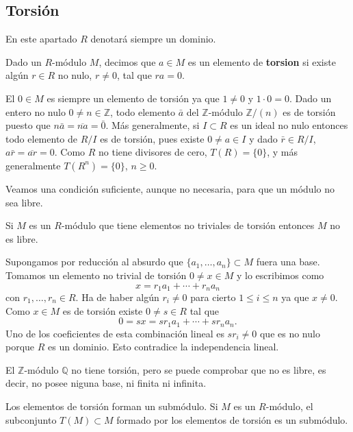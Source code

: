 \hypertarget{torsiuxf3n}{%
\subsection{Torsión}\label{torsiuxf3n}}

En este apartado \(R\) denotará siempre un dominio.


Dado un \(R\)-módulo \(M\), decimos que \(a\in M\) es un elemento de
\textbf{torsion} si existe algún \(r\in R\) no nulo, \(r\neq 0\), tal
que \(ra=0\). 


El \(0\in M\) es siempre un elemento de torsión ya que \(1\neq 0\) y
\(1\cdot 0 = 0\). Dado un entero no nulo \(0\neq n\in\mathbb Z\), todo
elemento \(\bar a\) del \(\mathbb Z\)-módulo \(\mathbb Z/(n)\) es de
torsión puesto que \(n\bar a=\overline{na}=\bar 0\). Más generalmente,
si \(I\subset R\) es un ideal no nulo entonces todo elemento de \(R/I\)
es de torsión, pues existe \(0\neq a\in I\) y dado \(\bar r\in R/I\),
\(a\bar r=\overline{ar}=0\). Como \(R\) no tiene divisores de cero,
\(T( {R} )=\{0\}\), y más generalmente \(T(R^n)=\{0\}\),
\(n\geq 0\). 

Veamos una condición suficiente, aunque no necesaria, para que un módulo
no sea libre.


Si \(M\) es un \(R\)-módulo que tiene elementos no triviales de torsión
entonces \(M\) no es libre. 


Supongamos por reducción al absurdo que
\(\{a_1,\dots,a_n\}\subset M\) fuera una base. Tomamos un elemento
no trivial de torsión \(0\neq x\in M\) y lo escribimos como
\[x=r_1a_1+\cdots+r_na_n\] con \(r_1,\dots,r_n\in R\). Ha de haber
algún \(r_i\neq 0\) para cierto \(1\leq i\leq n\) ya que \(x\neq 0\).
Como \(x\in M\) es de torsión existe \(0\neq s\in R\) tal que
\[0=sx=sr_1a_1+\cdots+sr_na_n.\] Uno de los coeficientes de esta
combinación lineal es \(sr_i\neq 0\) que es no nulo porque \(R\) es un
dominio. Esto contradice la independencia lineal. 


El \(\mathbb Z\)-módulo \(\mathbb Q\) no tiene torsión, pero se puede
comprobar que no es libre, es decir, no posee niguna base, ni finita ni
infinita. 

Los elementos de torsión forman un submódulo.  Si
\(M\) es un \(R\)-módulo, el subconjunto \(T(M)\subset M\) formado por
los elementos de torsión es un submódulo. 

